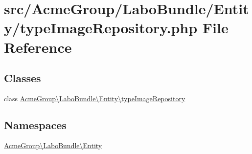 \hypertarget{type_image_repository_8php}{\section{src/\+Acme\+Group/\+Labo\+Bundle/\+Entity/type\+Image\+Repository.php File Reference}
\label{type_image_repository_8php}
}
\subsection*{Classes}
\begin{DoxyCompactItemize}
\item 
class \hyperlink{class_acme_group_1_1_labo_bundle_1_1_entity_1_1type_image_repository}{Acme\+Group\textbackslash{}\+Labo\+Bundle\textbackslash{}\+Entity\textbackslash{}type\+Image\+Repository}
\end{DoxyCompactItemize}
\subsection*{Namespaces}
\begin{DoxyCompactItemize}
\item 
 \hyperlink{namespace_acme_group_1_1_labo_bundle_1_1_entity}{Acme\+Group\textbackslash{}\+Labo\+Bundle\textbackslash{}\+Entity}
\end{DoxyCompactItemize}
